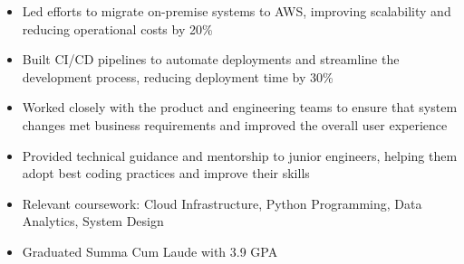 \par\smallskip
\begin{minipage}{13.75cm}
  \begin{minipage}{6.5cm}
    \begin{itemize}
      \item Led efforts to migrate on-premise systems to AWS, improving scalability and reducing operational costs by 20\%
      \item Built CI/CD pipelines to automate deployments and streamline the development process, reducing deployment time by 30\%
    \end{itemize}
  \end{minipage}
  \hfill
  \begin{minipage}{6.5cm}
    \begin{itemize}
      \item Worked closely with the product and engineering teams to ensure that system changes met business requirements and improved the overall user experience
      \item Provided technical guidance and mentorship to junior engineers, helping them adopt best coding practices and improve their skills
    \end{itemize}
  \end{minipage}
\end{minipage}

\par\bigskip
{}
\begin{itemize}
  \item Relevant coursework: Cloud Infrastructure, Python Programming, Data Analytics, System Design
\end{itemize}
\divider

\begin{itemize}
  \item Graduated Summa Cum Laude with 3.9 GPA
\end{itemize}


